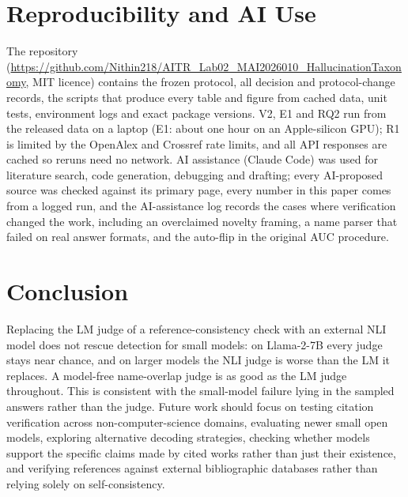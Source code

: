 \documentclass[acmsmall,screen]{acmart}
\begin{document}
\section{Reproducibility and AI Use}
The repository (\url{https://github.com/Nithin218/AITR_Lab02_MAI2026010_HallucinationTaxonomy}, MIT licence) contains the frozen protocol, all decision and protocol-change records, the scripts that produce every table and figure from cached data, unit tests, environment logs and exact package versions. V2, E1 and RQ2 run from the released data on a laptop (E1: about one hour on an Apple-silicon GPU); R1 is limited by the OpenAlex and Crossref rate limits, and all API responses are cached so reruns need no network. AI assistance (Claude Code) was used for literature search, code generation, debugging and drafting; every AI-proposed source was checked against its primary page, every number in this paper comes from a logged run, and the AI-assistance log records the cases where verification changed the work, including an overclaimed novelty framing, a name parser that failed on real answer formats, and the auto-flip in the original AUC procedure.

\section{Conclusion}
Replacing the LM judge of a reference-consistency check with an external NLI model does not rescue detection for small models: on Llama-2-7B every judge stays near chance, and on larger models the NLI judge is worse than the LM it replaces. A model-free name-overlap judge is as good as the LM judge throughout. This is consistent with the small-model failure lying in the sampled answers rather than the judge. Future work should focus on testing citation verification across non-computer-science domains, evaluating newer small open models, exploring alternative decoding strategies, checking whether models support the specific claims made by cited works rather than just their existence, and verifying references against external bibliographic databases rather than relying solely on self-consistency.



\end{document}
